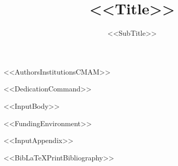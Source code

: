 \documentclass[%
USenglish,
<<DocumentClassOptions>>]{article}
\begin{document}

\title{<<Title>>}
\subtitle{<<SubTitle>>}

<<AuthorsInstitutionsCMAM>>




<<DedicationCommand>>
\aop
{}

\maketitle

<<InputBody>>

<<FundingEnvironment>>

\appendix
<<InputAppendix>>

<<BibLaTeXPrintBibliography>>
\end{document}
